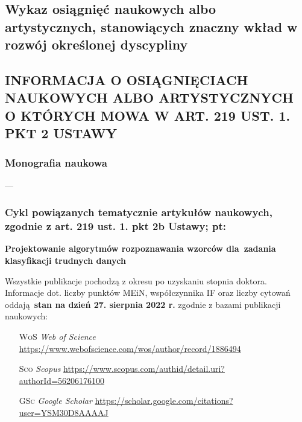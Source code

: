 \begin{fullwidth}

\chapter{Wykaz osiągnięć naukowych albo artystycznych, stanowiących znaczny wkład w rozwój określonej dyscypliny}

	
\section{INFORMACJA O OSIĄGNIĘCIACH NAUKOWYCH ALBO ARTYSTYCZNYCH O KTÓRYCH MOWA W ART. 219 UST. 1. PKT 2 USTAWY}

\subsection{Monografia naukowa}
---

\subsection{\textbf{Cykl powiązanych tematycznie artykułów naukowych, zgodnie z art. 219 ust. 1. pkt 2b Ustawy; pt:}}

\vspace{1em}
\begin{center}
	\LARGE
	\textbf{Projektowanie algorytmów rozpoznawania wzorców dla~zadania klasyfikacji trudnych danych}
\end{center}\vspace{1em}

\noindent Wszystkie publikacje pochodzą z okresu po uzyskaniu stopnia doktora. Informacje dot. liczby punktów MEiN, współczynnika IF oraz liczby cytowań  oddają \textbf{stan na dzień 27. sierpnia 2022 r.} zgodnie z bazami publikacji naukowych:

\begin{itemize}
	\item[\textsc{WoS}] \emph{Web of Science}
	\url{https://www.webofscience.com/wos/author/record/1886494}	
	\item[\textsc{Sco}] \emph{Scopus}
	\url{https://www.scopus.com/authid/detail.uri?authorId=56206176100}
	\item[\textsc{GSc}] \emph{Google Scholar}	
	\url{https://scholar.google.com/citations?user=YSM30D8AAAAJ}
\end{itemize}

\newpage

\end{fullwidth}

